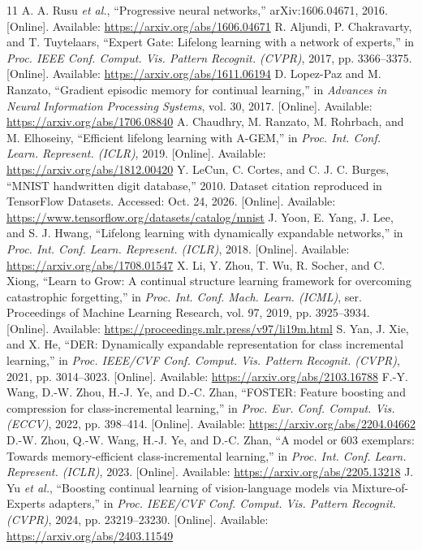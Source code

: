 \begin{thebibliography}{11}
 A. A. Rusu \emph{et al.}, ``Progressive neural networks,'' arXiv:1606.04671, 2016. [Online]. Available: \url{https://arxiv.org/abs/1606.04671}
 R. Aljundi, P. Chakravarty, and T. Tuytelaars, ``Expert Gate: Lifelong learning with a network of experts,'' in \emph{Proc. IEEE Conf. Comput. Vis. Pattern Recognit. (CVPR)}, 2017, pp. 3366--3375. [Online]. Available: \url{https://arxiv.org/abs/1611.06194}
 D. Lopez-Paz and M. Ranzato, ``Gradient episodic memory for continual learning,'' in \emph{Advances in Neural Information Processing Systems}, vol. 30, 2017. [Online]. Available: \url{https://arxiv.org/abs/1706.08840}
 A. Chaudhry, M. Ranzato, M. Rohrbach, and M. Elhoseiny, ``Efficient lifelong learning with A-GEM,'' in \emph{Proc. Int. Conf. Learn. Represent. (ICLR)}, 2019. [Online]. Available: \url{https://arxiv.org/abs/1812.00420}
 Y. LeCun, C. Cortes, and C. J. C. Burges, ``MNIST handwritten digit database,'' 2010. Dataset citation reproduced in TensorFlow Datasets. Accessed: Oct. 24, 2026. [Online]. Available: \url{https://www.tensorflow.org/datasets/catalog/mnist}
 J. Yoon, E. Yang, J. Lee, and S. J. Hwang, ``Lifelong learning with dynamically expandable networks,'' in \emph{Proc. Int. Conf. Learn. Represent. (ICLR)}, 2018. [Online]. Available: \url{https://arxiv.org/abs/1708.01547}
 X. Li, Y. Zhou, T. Wu, R. Socher, and C. Xiong, ``Learn to Grow: A continual structure learning framework for overcoming catastrophic forgetting,'' in \emph{Proc. Int. Conf. Mach. Learn. (ICML)}, ser. Proceedings of Machine Learning Research, vol. 97, 2019, pp. 3925--3934. [Online]. Available: \url{https://proceedings.mlr.press/v97/li19m.html}
 S. Yan, J. Xie, and X. He, ``DER: Dynamically expandable representation for class incremental learning,'' in \emph{Proc. IEEE/CVF Conf. Comput. Vis. Pattern Recognit. (CVPR)}, 2021, pp. 3014--3023. [Online]. Available: \url{https://arxiv.org/abs/2103.16788}
 F.-Y. Wang, D.-W. Zhou, H.-J. Ye, and D.-C. Zhan, ``FOSTER: Feature boosting and compression for class-incremental learning,'' in \emph{Proc. Eur. Conf. Comput. Vis. (ECCV)}, 2022, pp. 398--414. [Online]. Available: \url{https://arxiv.org/abs/2204.04662}
 D.-W. Zhou, Q.-W. Wang, H.-J. Ye, and D.-C. Zhan, ``A model or 603 exemplars: Towards memory-efficient class-incremental learning,'' in \emph{Proc. Int. Conf. Learn. Represent. (ICLR)}, 2023. [Online]. Available: \url{https://arxiv.org/abs/2205.13218}
 J. Yu \emph{et al.}, ``Boosting continual learning of vision-language models via Mixture-of-Experts adapters,'' in \emph{Proc. IEEE/CVF Conf. Comput. Vis. Pattern Recognit. (CVPR)}, 2024, pp. 23219--23230. [Online]. Available: \url{https://arxiv.org/abs/2403.11549}
\end{thebibliography}
